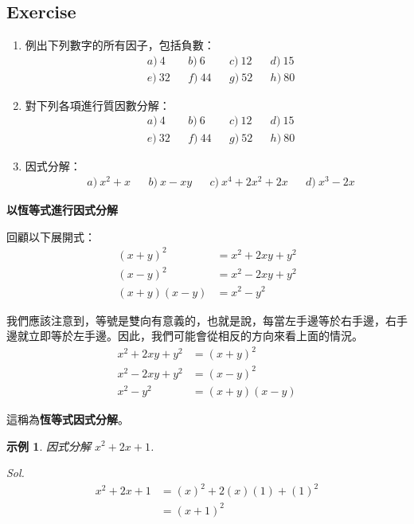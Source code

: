 \documentclass[12pt]{article}
\newtheorem{example}{示例}
\begin{document}
    \subsection*{Exercise}
    \begin{enumerate}
        \item 例出下列數字的所有因子，包括負數：\begin{align*}
            &a)\ 4&&b)\ 6&&c)\ 12&&d)\ 15\\
            &e)\ 32&&f)\ 44&&g)\ 52&&h)\ 80
        \end{align*}
        \item 對下列各項進行質因數分解：\begin{align*}
            &a)\ 4&&b)\ 6&&c)\ 12&&d)\ 15\\
            &e)\ 32&&f)\ 44&&g)\ 52&&h)\ 80
        \end{align*}
        \item 因式分解：\begin{align*}
            &a)\ x^2+x&&b)\ x-xy&&c)\ x^4+2x^2+2x&&d)\ x^3-2x
        \end{align*}
    \end{enumerate}

    \begin{center}
        \textbf{以恆等式進行因式分解}
    \end{center}

    回顧以下展開式：\begin{align*}
        (x+y)^2&=x^2+2xy+y^2\\
        (x-y)^2&=x^2-2xy+y^2\\
        (x+y)(x-y)&=x^2-y^2
    \end{align*}

    我們應該注意到，等號是雙向有意義的，也就是說，每當左手邊等於右手邊，右手邊就立即等於左手邊。因此，我們可能會從相反的方向來看上面的情況。\begin{align*}
        x^2+2xy+y^2&=(x+y)^2\\
        x^2-2xy+y^2&=(x-y)^2\\
        x^2-y^2&=(x+y)(x-y)
    \end{align*}

    這稱為\textbf{恆等式因式分解}。

    \begin{example}
        因式分解 $x^2+2x+1$.
    \end{example}
    \textit{ Sol. }\begin{align*}
        x^2+2x+1&=(x)^2+2(x)(1)+(1)^2\\
        &=(x+1)^2
    \end{align*}
\end{document}

